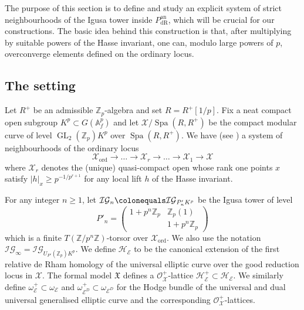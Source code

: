 \documentclass[10pt, oneside]{amsart}
\newcommand{\defeq}{\colonequals}
\numberwithin{equation}{subsection}
\theoremstyle{definition}
\theoremstyle{remark}
\newcommand{\mbb}[1]{\mathbb{#1}}
\newcommand{\opn}[1]{\operatorname{#1}}
\newcommand{\tbyt}[4]{\left( \begin{matrix} #1 & #2 \\ #3 & #4 \end{matrix} \right)}
\begin{document}
The purpose of this section is to define and study an explicit system of strict neighbourhoods of the Igusa tower inside $P_{\opn{dR}}^{\opn{an}}$, which will be crucial for our constructions. The basic idea behind this construction is that, after multiplying by suitable powers of the Hasse invariant, one can, modulo large powers of $p$, overconverge elements defined on the ordinary locus.


\subsection{The setting} \label{TheSettingSubSec}

Let $R^+$ be an admissible $\mbb{Z}_p$-algebra and set $R = R^+[1/p]$. Fix a neat compact open subgroup $K^p \subset G(\mbb{A}_f^p)$ and let $\mathcal{X}/\opn{Spa}(R, R^+)$ be the compact modular curve of level $\opn{GL}_2(\mbb{Z}_p)K^p$ over $\opn{Spa}(R, R^+)$. We have (see \cite{Katz}) a system of neighbourhoods of the ordinary locus
\[
\mathcal{X}_{\opn{ord}} \to \ldots \to \mathcal{X}_r \to \ldots \to \mathcal{X}_1 \to \mathcal{X}
\]
where $\mathcal{X}_r$ denotes the (unique) quasi-compact open whose rank one points $x$ satisfy $|h|_x \geq p^{-1/p^{r+1}}$ for any local lift $h$ of the Hasse invariant. 

For any integer $n \geq 1$, let $\mathcal{IG}_n \defeq \mathcal{IG}_{P'_n K^p}$ be the Igusa tower of level
\[
P'_n = \tbyt{1 + p^n \mbb{Z}_p}{\mbb{Z}_p(1)}{}{1+p^n \mbb{Z}_p}
\]
which is a finite $T(\mbb{Z}/p^n \mbb{Z})$-torsor over $\mathcal{X}_{\opn{ord}}$. We also use the notation $\mathcal{IG}_{\infty} = \mathcal{IG}_{U_{P'}(\mbb{Z}_p)K^p}$. We define $\mathcal{H}_{\mathcal{E}}$ to be the canonical extension of the first relative de Rham homology of the universal elliptic curve over the good reduction locus in $\mathcal{X}$. The formal model $\mathfrak{X}$ defines a $\mathcal{O}_{\mathcal{X}}^+$-lattice $\mathcal{H}_{\mathcal{E}}^+ \subset \mathcal{H}_{\mathcal{E}}$. We similarly define $\omega_{\mathcal{E}}^+ \subset \omega_{\mathcal{E}}$ and $\omega_{\mathcal{E}^D}^+ \subset \omega_{\mathcal{E}^D}$ for the Hodge bundle of the universal and dual universal generalised elliptic curve and the corresponding $\mathcal{O}_{\mathcal{X}}^+$-lattices.
\end{document}
